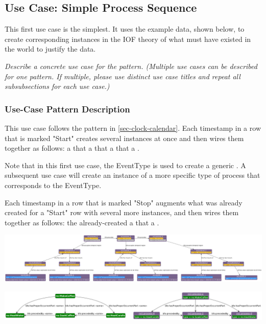 \subsection*{Use Case: Simple Process Sequence}\label{SimpleProcessSequence}
This first use case is the simplest. It uses the example data, shown below, to create corresponding instances in the IOF theory of what must have existed in the world to justify the data.

 \textit{ 
Describe a concrete use case for the pattern. (Multiple use cases can be described for one pattern. If multiple, please use distinct use case titles and repeat all subsubsections for each use case.)
  }

\newcommand{\ti}{\cname{bfo}{TemporalInstant }}

\subsubsection*{Use-Case Pattern Description}
This use case follows the pattern in \ref{sec-clock-calendar}.
Each timestamp in a row that is marked "Start" creates several instances at once and then wires them together as follows:
a  that  a \ti that  a  that  a .

Note that in this first use case, the EventType is used to create a generic . A subsequent use case will create an instance of a more specific type of process that corresponds to the EventType.

Each timestamp in a row that is marked "Stop" augments what was already created for a "Start" row with several more instances, and then wires them together as follows:
the already-created   a  that  a .

\includegraphics[scale=0.175]{scenarios/simple-process-sequence/image/instances.rdf.png}

\includegraphics[scale=0.28]{scenarios/simple-process-sequence/image/advanced-instances.rdf.png}

